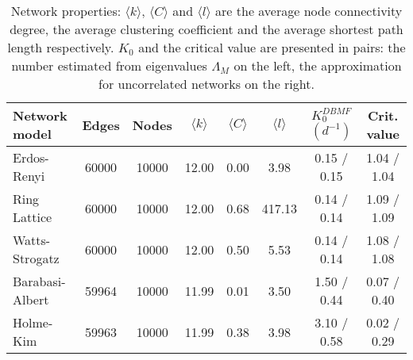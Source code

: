 \begin{table}[h]
\centering
\caption{Network properties: $\langle k \rangle$, $\langle C \rangle$ and $\langle l \rangle$ are the average node connectivity degree, the average clustering coefficient and the average shortest path length respectively. $K_0$ and the critical value are presented in pairs: the number estimated from eigenvalues $\Lambda_M$ on the left, the approximation for uncorrelated networks on the right.}  %
\label{tab:networks}
\begin{tabular}{lccccccc}
\toprule
         Network model &  Edges &  Nodes & $\langle k \rangle$ & $\langle C \rangle$ & $\langle l \rangle$ & $K_0^{DBMF}$ $(d^{-1})$ & Crit. value \\ 
\midrule
     Erdos-Renyi &  60000 &  10000 & 12.00 &  0.00 &    3.98 & 	  0.15 / 0.15 &   1.04 / 1.04 \\
    Ring Lattice &  60000 &  10000 & 12.00 &  0.68 &  417.13 &    0.14 / 0.14 &   1.09 / 1.09 \\
  Watts-Strogatz &  60000 &  10000 & 12.00 &  0.50 &    5.53 &    0.14 / 0.14 &   1.08 / 1.08 \\
 Barabasi-Albert &  59964 &  10000 & 11.99 &  0.01 &    3.50 &    1.50 / 0.44 &   0.07 / 0.40\\
       Holme-Kim &  59963 &  10000 & 11.99 &  0.38 &    3.98 &    3.10 / 0.58 &   0.02 / 0.29\\
\bottomrule
\end{tabular}
\end{table}
